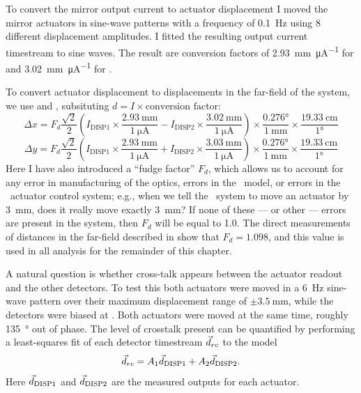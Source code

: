 To convert the mirror output current to actuator displacement I moved the mirror actuators in sine-wave patterns with a frequency of \SI{0.1}{\Hz} using 8 different displacement amplitudes.
I fitted the resulting output current timestream to sine waves.
The result are conversion factors of \SI{2.93}{\mm\per\uA} for  and \SI{3.02}{\mm\per\uA} for .

To convert actuator displacement to displacements in the far-field of the system, we use  and , subsituting $d = I \times \text{conversion factor}$:
\begin{equation}
\Delta x = F_d \frac{\sqrt{2}}{2} \left( I_{\text{DISP1}} \times \frac{\SI{2.93}{\mm}}{\SI{1}{\uA}} -
                              I_{\text{DISP2}} \times \frac{\SI{3.02}{\mm}}{\SI{1}{\uA}}  \right) \times
    \frac{\ang{0.276}} {\SI{1}{\mm}} \times
    \frac{\SI{19.33}{\cm}} {\ang{1}}
\end{equation}
\begin{equation}
\Delta y = F_d \frac{\sqrt{2}}{2} \left( I_{\text{DISP1}} \times \frac{\SI{2.93}{\mm}}{\SI{1}{\uA}} +
                              I_{\text{DISP2}} \times \frac{\SI{3.03}{\mm}}{\SI{1}{\uA}}  \right) \times
    \frac{\ang{0.276}} {\SI{1}{\mm}} \times
    \frac{\SI{19.33}{\cm}} {\ang{1}}
\end{equation}
Here I have also introduced a ``fudge factor'' $F_d$, which allows us to account for any error in manufacturing of the optics, errors in the \ZEMAX\ model, or errors in the \BOSE\ actuator control system; e.g., when we tell the \BOSE\ system to move an actuator by \SI{3}{\mm}, does it really move exactly \SI{3}{\mm}?
If none of these --- or other --- errors are present in the system, then $F_d$ will be equal to 1.0.
The direct measurements of distances in the far-field described in  show that $F_d = 1.098$, and this value is used in all analysis for the remainder of this chapter.


A natural question is whether cross-talk appears between the actuator readout and the other detectors.
To test this both actuators were moved in a \SI{6}{\Hz} sine-wave pattern over their maximum displacement range of $\pm\SI{3.5}{\mm}$, while the detectors were biased at \SOC.
Both actuators were moved at the same time, roughly \SI{135}{\degree} out of phase.
The level of crosstalk present can be quantified by performing a least-squares fit of each detector timestream $\vec{d}_{rc}$ to the model
\begin{equation}
	 \vec{d}_{rc} = A_1 \vec{d}_{\text{DISP1}} + A_2 \vec{d}_{\text{DISP2}}.
\end{equation}
Here $\vec{d}_{\text{DISP1}}$ and $\vec{d}_{\text{DISP2}}$ are the measured outputs for each actuator.

